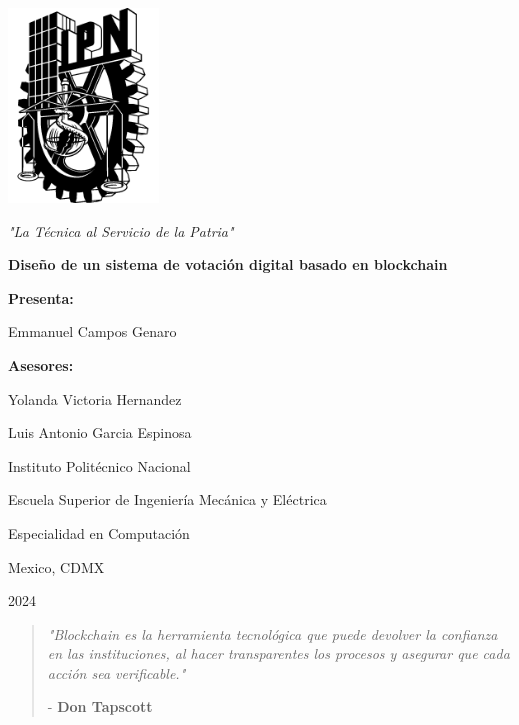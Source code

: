 \documentclass{report}
\begin{document}
	
	\begin{titlepage}
		\centering
		\vspace*{1in}
		\includegraphics[width=0.3\textwidth]{ipn_logo.png}\par
		\vspace{1cm}
		\textit{"La Técnica al Servicio de la Patria"}\par
		\vspace{2cm}
		{\huge \textbf{Diseño de un sistema de votación digital basado en blockchain}\par}
		\vspace{2cm}
		\large
		\textbf{Presenta:}\par
		Emmanuel Campos Genaro\par
		\vspace{2cm}
		\textbf{Asesores:}\par
		Yolanda Victoria Hernandez\par
		Luis Antonio Garcia Espinosa\par
		\vfill
		\large
		Instituto Politécnico Nacional\par
		Escuela Superior de Ingeniería Mecánica y Eléctrica\par
		Especialidad en Computación\par
		\vspace{0.5cm}
		Mexico, CDMX\par
		2024
	\end{titlepage}
	
	\newpage
	\thispagestyle{empty}
	\vspace*{\fill}
	\begin{center}
		\begin{quote}
			\textit{"Blockchain es la herramienta tecnológica que puede devolver la confianza en las instituciones, al hacer transparentes los procesos y asegurar que cada acción sea verificable."}
			
			\vspace{1cm}
			- \textbf{Don Tapscott}
		\end{quote}
	\end{center}
	\vspace*{\fill}
	
\end{document}
